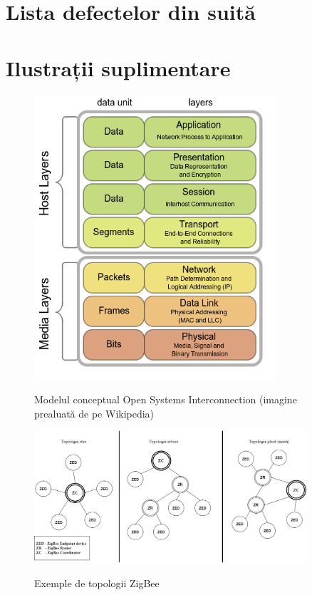 \begin{appendices}

\chapter{Lista defectelor din suită}
\label{apx:defecte}

\chapter{Ilustrații suplimentare}
\label{apx:ilustratii}

\begin{figure}[h]
    \centering
    \caption{\centering Modelul conceptual Open Systems Interconnection \newline (imagine prealuată de pe Wikipedia)}
    \includegraphics[width=0.8\textwidth]{images/OSI_Model_v1.png}
    \label{fig:osi_model}
\end{figure}

\begin{figure}[h]
    \centering
    \caption{Exemple de topologii ZigBee}
    \includegraphics[width=0.9\textwidth]{images/topologii.drawio.png}
    \label{fig:zigbee_networks}
\end{figure}

\end{appendices}